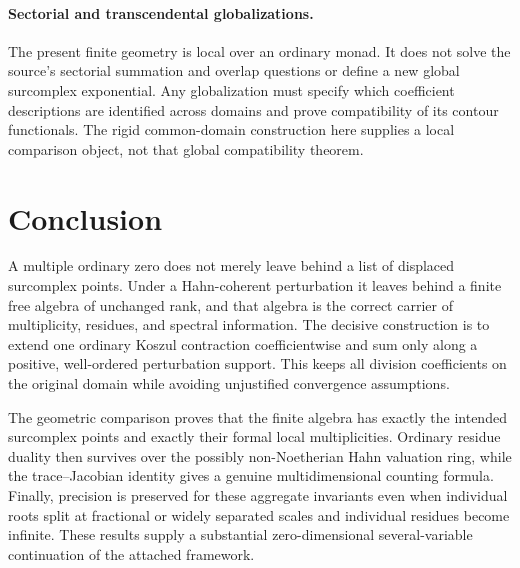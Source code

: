 \documentclass[11pt,letterpaper]{article}
\theoremstyle{definition}
\theoremstyle{remark}
\numberwithin{equation}{section}
\begin{document}
\paragraph{Sectorial and transcendental globalizations.}
The present finite geometry is local over an ordinary monad. It does not solve the source's sectorial summation and overlap questions or define a new global surcomplex exponential. Any globalization must specify which coefficient descriptions are identified across domains and prove compatibility of its contour functionals. The rigid common-domain construction here supplies a local comparison object, not that global compatibility theorem.

\section{Conclusion}
A multiple ordinary zero does not merely leave behind a list of displaced surcomplex points. Under a Hahn-coherent perturbation it leaves behind a finite free algebra of unchanged rank, and that algebra is the correct carrier of multiplicity, residues, and spectral information. The decisive construction is to extend one ordinary Koszul contraction coefficientwise and sum only along a positive, well-ordered perturbation support. This keeps all division coefficients on the original domain while avoiding unjustified convergence assumptions.

The geometric comparison proves that the finite algebra has exactly the intended surcomplex points and exactly their formal local multiplicities. Ordinary residue duality then survives over the possibly non-Noetherian Hahn valuation ring, while the trace--Jacobian identity gives a genuine multidimensional counting formula. Finally, precision is preserved for these aggregate invariants even when individual roots split at fractional or widely separated scales and individual residues become infinite. These results supply a substantial zero-dimensional several-variable continuation of the attached framework.

\appendix
\end{document}
